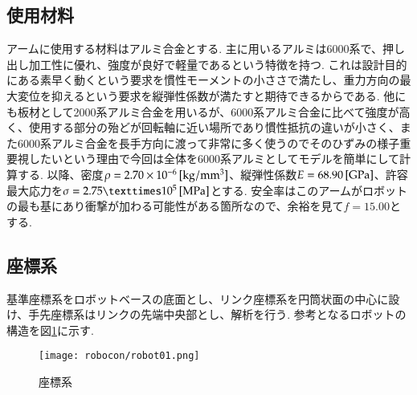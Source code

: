 \documentclass[10pt,b5paper,papersize,dvipdfmx]{jsbook}
\begin{document}
\subsection{使用材料}
アームに使用する材料はアルミ合金とする. 主に用いるアルミは6000系で、押し出し加工性に優れ、強度が良好で軽量であるという特徴を持つ. これは設計目的にある素早く動くという要求を慣性モーメントの小ささで満たし、重力方向の最大変位を抑えるという要求を縦弾性係数が満たすと期待できるからである. 他にも板材として2000系アルミ合金を用いるが、6000系アルミ合金に比べて強度が高く、使用する部分の殆どが回転軸に近い場所であり慣性抵抗の違いが小さく、また6000系アルミ合金を長手方向に渡って非常に多く使うのでそのひずみの様子重要視したいという理由で今回は全体を6000系アルミとしてモデルを簡単にして計算する. 以降、密度$\rho=2.70\times 10^{-6}\tani*{kg/mm^3}$、縦弾性係数$E=68.90 \tani*{GPa}$、許容最大応力を$\sigma=2.75×10^{5} \tani*{MPa}$とする. 安全率はこのアームがロボットの最も基にあり衝撃が加わる可能性がある箇所なので、余裕を見て$f=15.00$とする.
\subsection{座標系}\label{座標系}
基準座標系をロボットベースの底面とし、リンク座標系を円筒状面の中心に設け、手先座標系はリンクの先端中央部とし、解析を行う. 参考となるロボットの構造を図\ref{fig:座標系}に示す. 
\begin{figure}[htbp]
  \centering
  \texttt{[image: robocon/robot01.png]}
  \caption{座標系}
  \label{fig:座標系}
\end{figure}
\end{document}

